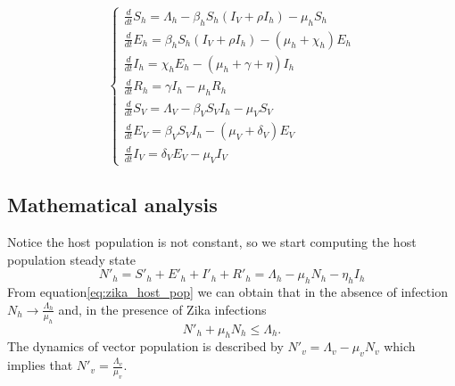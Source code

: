 \documentclass{book}
\begin{document}
\begin{equation} \label{eq:zika_model}
\left\{\begin{array}{l}
\frac{d}{d t} S_{h}=\Lambda_{h}-\beta_{h} S_{h}\left(I_{V}+\rho I_{h}\right)-\mu_{h} S_{h} \\
\frac{d}{d t} E_{h}=\beta_{h} S_{h}\left(I_{V}+\rho I_{h}\right)-\left(\mu_{h}+\chi_{h}\right) E_{h} \\
\frac{d}{d t} I_{h}=\chi_{h} E_{h}-\left(\mu_{h}+\gamma+\eta\right) I_{h} \\
\frac{d}{d t} R_{h}=\gamma I_{h}-\mu_{h} R_{h} \\[2ex]
\frac{d}{d t} S_{V}=\Lambda_{V}-\beta_{V} S_{V} I_{h}-\mu_{V} S_{V} \\
\frac{d}{d t} E_{V}=\beta_{V} S_{V} I_{h}-\left(\mu_{V}+\delta_{V}\right) E_{V} \\
\frac{d}{d t} I_{V}=\delta_{V} E_{V}-\mu_{V} I_{V}
\end{array}\right.
\end{equation}



\subsection*{Mathematical analysis}
Notice the host population is not constant, so we start computing the host population steady state
\begin{equation} \label{eq:zika_host_pop}
    N'_h=S'_h+E'_h+I'_h+R'_h=\Lambda_h-\mu_h N_h-\eta_h I_h
\end{equation}
From equation\eqref{eq:zika_host_pop} we can obtain that in the absence of infection $N_h\rightarrow \frac{\Lambda_h}{\mu_h}$ and, in the presence of Zika infections
$$
N'_{h}+\mu_{h} N_{h} \leq \Lambda_{h}.
$$
The dynamics of vector population is described by $N'_{v}=\Lambda_{v}-\mu_{v} N_{v}$ which implies that $N'_{v}=\frac{\Lambda_v}{\mu_v}$.
\end{document}
